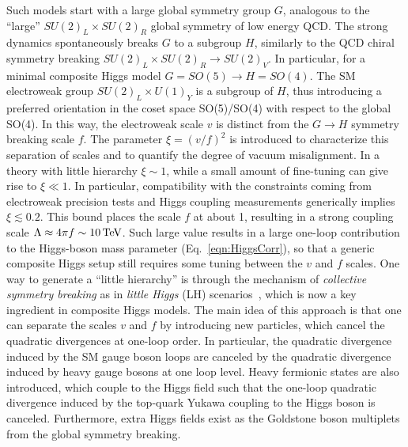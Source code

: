 Such models start with a large global symmetry group $G$, analogous to the ``large'' $SU(2)_L \times SU(2)_R$ global symmetry of low energy QCD.
The strong dynamics spontaneously breaks $G$ to a subgroup $H$, similarly to the QCD chiral symmetry breaking $SU(2)_L \times SU(2)_R \to SU(2)_V$.
In particular, for a minimal composite Higgs model $G = SO(5) \to H = SO(4)$.
The SM electroweak group $SU(2)_L \times U(1)_Y$ is a subgroup of $H$, thus introducing a preferred orientation in the coset space SO(5)/SO(4) with respect to the global SO(4).
In this way, the electroweak scale $v$ is distinct from the $G \to H$ symmetry breaking scale $f$. The parameter $\xi = (v/f)^2$ is introduced to characterize this separation of scales and to quantify the degree of vacuum misalignment.
In a theory with little hierarchy $\xi \sim 1$, while a small amount of fine-tuning can give rise to $\xi \ll 1$. In particular, compatibility with the constraints coming from electroweak precision tests and Higgs coupling measurements generically implies $\xi \lesssim 0.2$. This bound places the scale $f$ at about 1\TeV, resulting in a strong coupling scale $\Lambda \approx 4\pi f \sim 10\,\text{Te\hspace{-.08em}V}$.
Such large value results in a large one-loop contribution to the Higgs-boson mass parameter (Eq.~\ref{eqn:HiggsCorr}), so that a generic composite Higgs setup still requires some tuning between the $v$ and $f$ scales.
One way to generate a ``little hierarchy'' is through the mechanism of \textit{collective symmetry breaking} as in \textit{little Higgs} (LH) scenarios~\cite{Han:2003wu,Perelstein:2005ka,Schmaltz:2005ky,Arkani:2002LH,Burdman:2002ns}, which is now a key ingredient in composite Higgs models.
The main idea of this approach is that one can separate the scales $v$ and $f$ by introducing new particles, which cancel the quadratic divergences at one-loop order. 
In particular, the quadratic divergence induced by the SM gauge boson loops are canceled by the quadratic divergence induced by heavy gauge bosons at one loop level.
Heavy fermionic states are also introduced, which couple to the Higgs field such that the one-loop quadratic divergence induced by the top-quark Yukawa coupling to the Higgs boson is canceled.
Furthermore, extra Higgs fields exist as the Goldstone boson multiplets from the global symmetry breaking.
